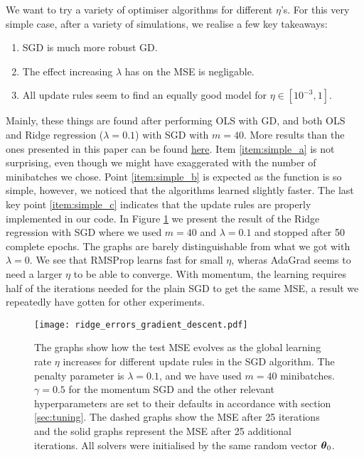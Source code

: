     We want to try a variety of optimiser algorithms for different $\eta$'s. For this very simple case, after a variety of simulations, we realise a few key takeaways:
    \begin{enumerate}[label=\alph*)]
        \item\label{item:simple_a} SGD is much more robust GD.
        \item\label{item:simple_b} The effect increasing $\lambda$ has on the MSE is negligable.
        \item\label{item:simple_c} All update rules seem to find an equally good model for $\eta\in [10^{-3}, 1]$.
    \end{enumerate}
    Mainly, these things are found after performing OLS with GD, and both OLS and Ridge regression ($\lambda=0.1$) with SGD with $m=40$. More results than the ones presented in this paper can be found \href{\figureslink}{here}. Item \ref{item:simple_a} is not surprising, even though we might have exaggerated with the number of minibatches we chose. Point \ref{item:simple_b} is expected as the function is so simple, however, we noticed that the algorithms learned slightly faster. The last key point \ref{item:simple_c} indicates that the update rules are properly implemented in our code. In Figure \ref{fig:simple_reg_errors_ridge} we present the result of the Ridge regression with SGD where we used $m=40$ and $\lambda=0.1$ and stopped after 50 complete epochs. The graphs are barely distinguishable from what we got with $\lambda=0$. We see that RMSProp learns fast for small $\eta$, wheras AdaGrad seems to need a larger $\eta$ to be able to converge. With momentum, the learning requires half of the iterations needed for the plain SGD to get the same MSE, a result we repeatedly have gotten for other experiments.

    \begin{figure}
        \texttt{[image: ridge\_errors\_gradient\_descent.pdf]}
        \caption{The graphs show how the test MSE evolves as the global learning rate $\eta$ increases for different update rules in the SGD algorithm. The penalty parameter is $\lambda=0.1$, and we have used $m=40$ minibatches. $\gamma=0.5$ for the momentum SGD and the other relevant hyperparameters are set to their defaults in accordance with section \ref{sec:tuning}. The dashed graphs show the MSE after 25 iterations and the solid graphs represent the MSE after 25 additional iterations. All solvers were initialised by the same random vector $\boldsymbol{\theta}_0$.}
        \label{fig:simple_reg_errors_ridge}
    \end{figure}

